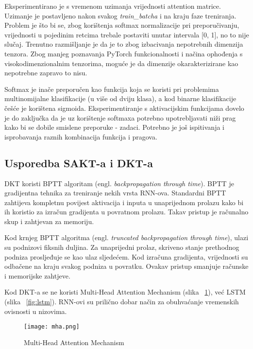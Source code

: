 		Eksperimentirano je s vremenom uzimanja vrijednosti attention matrice. Uzimanje je postavljeno nakon svakog \textit{train\_batcha} i na kraju faze treniranja. Problem je što bi se, zbog korištenja softmax normalizacije pri preporučivanju, vrijednosti u pojedinim retcima trebale postaviti unutar intervala [0, 1], no to nije slučaj. Trenutno razmišljanje je da je to zbog izbacivanja nepotrebnih dimenzija tenzora. Zbog manjeg poznavanja PyTorch funkcionalnosti i načina ophođenja s visokodimenzionalnim tenzorima, moguće je da dimenzije okarakterizirane kao nepotrebne zapravo to nisu.

		Softmax je inače preporučen kao funkcija koja se koristi pri problemima multinomijalne klasifikacije (u više od dviju klasa), a kod binarne klasifikacije češće je korištena sigmoida. Eksperimentiranje s aktivacijskim funkcijama dovelo je do zaključka da je uz korištenje softmaxa potrebno upotrebljavati niži prag kako bi se dobile smislene preporuke - zadaci. Potrebno je još ispitivanja i isprobavanja raznih kombinacija funkcija i pragova.

		\subsection{Usporedba SAKT-a i DKT-a}

		DKT koristi BPTT algoritam (engl. \textit{backpropagation through time}). BPTT je gradijentna tehnika za treniranje nekih vrsta RNN-ova. Standardni BPTT zahtijeva kompletnu povijest aktivacija i inputa u unaprijednom prolazu kako bi ih koristio za izračun gradijenta u povratnom prolazu. Takav pristup je računalno skup i zahtjevan za memoriju.

		Kod krnjeg BPTT algoritma (engl. \textit{truncated backpropagation through time}), ulazi su podnizovi fiksnih duljina. Za unaprijedni prolaz, skriveno stanje prethodnog podniza prosljeđuje se kao ulaz sljedećem. Kod izračuna gradijenta, vrijednosti su odbačene na kraju svakog podniza u povratku. Ovakav pristup smanjuje računske i memorijske zahtjeve.

		Kod DKT-a se ne koristi Multi-Head Attention Mechanism (slika ~\ref{fig:mha}), već LSTM (slika ~\ref{fig:lstm}). RNN-ovi su prilično dobar način za obuhvaćanje vremenskih ovisnosti u nizovima.
\pagebreak

	\begin{figure}[!htb]
		\centering
		\texttt{[image: mha.png]}
		\caption{Multi-Head Attention Mechanism}
		\label{fig:mha}
	\end{figure}


